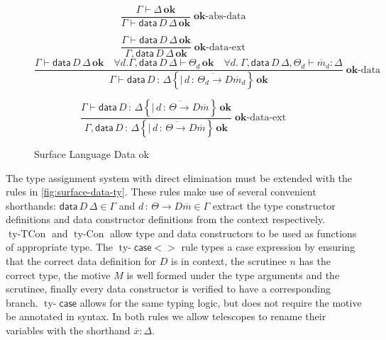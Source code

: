 \begin{figure}
\[
\frac{\Gamma\vdash\Delta\,\mathbf{ok}}{\Gamma\vdash\mathsf{data}\,D\,\Delta\,\mathbf{ok}}\operatorname{\mathbf{ok}-abs-data}
\]

\[
\frac{\Gamma\vdash\mathsf{data}\,D\,\Delta\,\mathbf{ok}}{\Gamma,\mathsf{data}\,D\,\Delta\,\mathbf{ok}}\operatorname{\mathbf{ok}-data-ext}
\]
\[
\frac{\Gamma\vdash\mathsf{data}\,D\,\Delta\,\mathbf{ok}\quad\forall d.\Gamma,\mathsf{data}\,D\,\Delta\vdash\varTheta_{d}\,\mathbf{ok}\quad\forall d.\:\Gamma,\mathsf{data}\,D\,\Delta,\varTheta_{d}\vdash\overline{m}_{d}:\Delta}{\Gamma\vdash\mathsf{data}\,D\,:\,\Delta\left\{ \overline{|\,d\,:\,\varTheta_{d}\rightarrow D\overline{m}_{d}}\right\} \,\mathbf{ok}}\operatorname{\mathbf{ok}-data}
\]

\[
\frac{\Gamma\vdash\mathsf{data}\,D\,:\,\Delta\left\{ \overline{|\,d\,:\,\varTheta\rightarrow D\overline{m}}\right\} \,\mathbf{ok}}{\Gamma,\mathsf{data}\,D\,:\,\Delta\left\{ \overline{|\,d\,:\,\varTheta\rightarrow D\overline{m}}\right\} \,\mathbf{ok}}\operatorname{\mathbf{ok}-data-ext}
\]

\caption{Surface Language Data ok}
\label{fig:surface-data-ok}
\end{figure}

The type assignment system with direct elimination must be extended
with the rules in \ref{fig:surface-data-ty}. These rules make use
of several convenient shorthands: $\mathsf{data}\,D\,\Delta\in\Gamma$
and $d\,:\,\varTheta\rightarrow D\overline{m}\in\Gamma$ extract the
type constructor definitions and data constructor definitions from
the context respectively. $\operatorname{ty-TCon}$ and $\operatorname{ty-Con}$
allow type and data constructors to be used as functions of appropriate
type. The $\operatorname{ty-}\mathsf{case}<>$ rule types a case expression
by ensuring that the correct data definition for $D$ is in context,
the scrutinee $n$ has the correct type, the motive $M$ is well formed
under the type arguments and the scrutinee, %
finally every data constructor is verified to have a corresponding
branch. $\operatorname{ty-}\mathsf{case}$ allows for the same typing
logic, but does not require the motive be annotated in syntax. In
both rules we allow telescopes to rename their variables with the
shorthand $\overline{x}:\Delta$.

